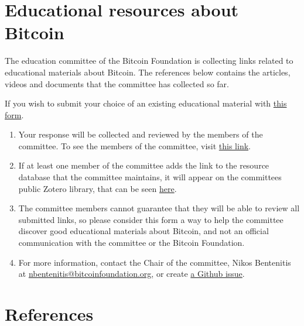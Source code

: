 \documentclass{article}
\begin{document}
\section*{Educational resources about Bitcoin}

The education committee of the Bitcoin Foundation is collecting links related to educational materials about Bitcoin. The references below contains the articles, videos and documents that the committee has collected so far.

If you wish to submit your choice of an existing educational material with \href{https://docs.google.com/forms/d/1bDA-s3yfhkxfHkz_F426Gov6xpdEfSJzmYN0unyO9bs/viewform}{this form}. 

\begin{enumerate}
\item Your response will be collected and reviewed by the members of the committee. To see the members of the committee, visit \href{https://github.com/btcfoundationedcom/btcfoundationedcom.github.io/graphs/contributors}{this link}.
\item If at least one member of the committee adds the link to the resource database that the committee maintains, it will appear on the committees public Zotero library, that can be seen \href{https://www.zotero.org/groups/bfeducomm/items/}{here}.
\item The committee members cannot guarantee that they will be able to review all submitted links, so please consider this form a way to help the committee discover good educational materials about Bitcoin, and not an official communication with the committee or the Bitcoin Foundation.
\item For more information, contact the Chair of the committee, Nikos Bentenitis at \url{nbentenitis@bitcoinfoundation.org}, or create \href{https://github.com/btcfoundationedcom/btcfoundationedcom.github.io/issues/new}{a Github issue}.

\end{enumerate}

\section*{References}

\nocite{*}
\printbibliography
\end{document}
